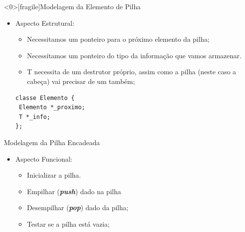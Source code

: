 \documentclass[12pt,table,xcolor={dvipsnames}]{beamer}
\begin{document}
\begin{frame}<0>[fragile]{Modelagem da Elemento de Pilha}

\begin{itemize}
\item Aspecto Estrutural:
\begin{itemize}
\item Necessitamos um ponteiro para o próximo elemento da pilha;
\item Necessitamos um ponteiro do tipo da informação que vamos armazenar.
\item T necessita de um destrutor próprio, assim como a pilha (neste caso a cabeça) vai precisar de um também;
\end{itemize}
\begin{lstlisting}
classe Elemento {
 Elemento *_proximo;
 T *_info;
};
\end{lstlisting}
\end{itemize}
\end{frame}

\begin{frame}[fragile]{Modelagem da Pilha Encadeada}

\begin{itemize}
\item Aspecto Funcional:
\begin{itemize}
\item Inicializar a pilha.
\item Empilhar (\textit{\textbf{push}}) dado na pilha
\item Desempilhar (\textit{\textbf{pop}}) dado da pilha;
\item Testar se a pilha está vazia;

\end{itemize}
\end{itemize}
\end{frame}
\end{document}

